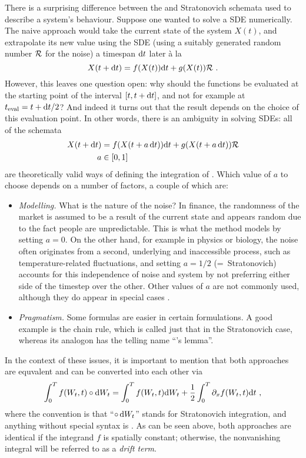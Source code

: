 There is a surprising difference between the \Ito{} and Stratonovich schemata used to describe a system's behaviour. Suppose one wanted to solve a SDE numerically. The naive approach would take the current state of the system \(X(t)\), and extrapolate its new value using the SDE (using a suitably generated random number \(\mathcal{R}\) for the noise) a timespan \(\mathrm{d} t\) later \`a la
%
\begin{equation}
	X(t+\mathrm{d} t) = f(X(t))\mathrm{d} t + g(X(t)) \mathcal{R} ~.
\end{equation}
%
However, this leaves one question open: why should the functions be evaluated at the starting point of the interval \([t,t+\mathrm{d} t]\), and not for example at \(t_\text{eval} = t+\mathrm{d} t/2\)? And indeed it turns out that the result depends on the choice of this evaluation point. In other words, there is an ambiguity in solving SDEs: all of the schemata
%
\begin{align}
	X(t+\mathrm{d} t) &= f(X(t+a\,\mathrm{d} t))\mathrm{d} t + g(X(t+a\,\mathrm{d} t)) \mathcal{R} \\
	a &\in [0,1]
\end{align}
%
are theoretically valid ways of defining the integration of . Which value of \(a\) to choose depends on a number of factors, a couple of which are:
%
\begin{itemize}
	\item \emph{Modelling.} What is the nature of the noise? In finance, the randomness of the market is assumed to be a result of the current state and appears random due to the fact people are unpredictable. This is what the \Ito{} method models by setting \(a = 0\). On the other hand, for example in physics or biology, the noise often originates from a second, underlying and inaccessible process, such as temperature-related fluctuations, and setting \(a = 1/2\) (=~Stratonovich) accounts for this independence of noise and system by not preferring either side of the timestep over the other. Other values of \(a\) are not commonly used, although they do appear in special cases .
	\item \emph{Pragmatism.} Some formulas are easier in certain formulations. A good example is the chain rule, which is called just that in the Stratonovich case, whereas its analogon has the telling name ``\Ito{}'s lemma''.
\end{itemize}
%
In the context of these issues, it is important to mention that both approaches are equvalent and can be converted into each other via
%
\begin{equation}
	\int_0^Tf(W_t,t)\circ\mathrm{d} W_t
	=
	\int_0^Tf(W_t,t)\mathrm{d} W_t
	+
	\frac12\int_0^T \partial_xf(W_t,t)\mathrm{d} t ~,
\end{equation}
%
where the convention is that ``\(\circ\,\mathrm{d} W_t\)'' stands for Stratonovich integration, and anything without special syntax is \Ito{}. As can be seen above, both approaches are identical if the integrand \(f\) is spatially constant; otherwise, the nonvanishing integral will be referred to as a \emph{drift term}.


